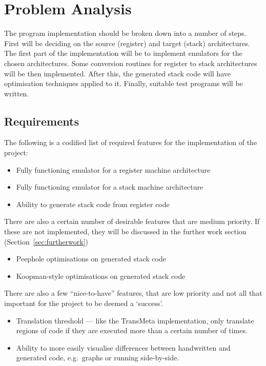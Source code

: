 \chapter{Problem Analysis}\label{ch:problemanalysis}
The program implementation should be broken down into a number of steps. First
will be deciding on the source (register) and target (stack) architectures.  The
first part of the implementation will be to implement emulators for the chosen
architectures.  Some conversion routines for register to stack architectures
will be then implemented. After this, the generated stack code will have
optimisation techniques applied to it. Finally, suitable test programs will be
written.

\section{Requirements}
The following is a codified list of required features for the implementation of
the project:

\begin{itemize}[noitemsep]
  \item Fully functioning emulator for a register machine architecture
  \item Fully functioning emulator for a stack machine architecture
  \item Ability to generate stack code from register code
\end{itemize}

There are also a certain number of desirable features that are medium priority.
If these are not implemented, they will be discussed in the further work section (Section~\ref{sec:furtherwork})

\begin{itemize}[noitemsep]
  \item Peephole optimisations on generated stack code
  \item Koopman-style optimisations on generated stack code
\end{itemize}

There are also a few ``nice-to-have'' features, that are low priority and not
all that important for the project to be deemed a `success'.

\begin{itemize}[noitemsep]
  \item Translation threshold --- like the TransMeta implementation, only
  translate regions of code if they are executed more than a certain number of
  times.
  \item Ability to more easily visualise differences between handwritten and
  generated code, e.g.\ graphs or running side-by-side.
\end{itemize}
